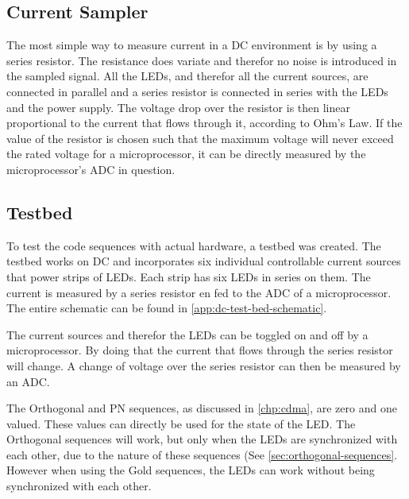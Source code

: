 








\subsection{Current Sampler}

The most simple way to measure current in a DC environment is by using a series resistor.
The resistance does variate and therefor no noise is introduced in the sampled signal.
All the LEDs, and therefor all the current sources, are connected in parallel and a series resistor is connected in series with the LEDs and the power supply.
The voltage drop over the resistor is then linear proportional to the current that flows through it, according to Ohm's Law.
If the value of the resistor is chosen such that the maximum voltage will never exceed the rated voltage for a microprocessor, it can be directly measured by the microprocessor's ADC in question.









\subsection{Testbed}

To test the code sequences with actual hardware, a testbed was created.
The testbed works on DC and incorporates six individual controllable current sources that power strips of LEDs.
Each strip has six LEDs in series on them.
The current is measured by a series resistor en fed to the ADC of a microprocessor.
The entire schematic can be found in \autoref{app:dc-test-bed-schematic}. 



The current sources and therefor the LEDs can be toggled on and off by a microprocessor.
By doing that the current that flows through the series resistor will change.
A change of voltage over the series resistor can then be measured by an ADC.


The Orthogonal and PN sequences, as discussed in \autoref{chp:cdma}, are zero and one valued.
These values can directly be used for the state of the LED.
The Orthogonal sequences will work, but only when the LEDs are synchronized with each other, due to the nature of these sequences (See \autoref{sec:orthogonal-sequences}.
However when using the Gold sequences, the LEDs can work without being synchronized with each other.















